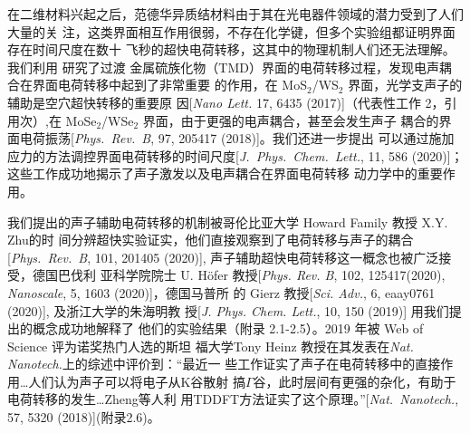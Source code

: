 


在二维材料兴起之后，范德华异质结材料由于其在光电器件领域的潜力受到了人们大量的关
注，这类界面相互作用很弱，不存在化学键，但多个实验组都证明界面存在时间尺度在数十
飞秒的超快电荷转移，这其中的物理机制人们还无法理解。我们利用 \hnamd{} 研究了过渡
金属硫族化物（TMD）界面的电荷转移过程，发现电声耦合在界面电荷转移中起到了非常重要
的作用，在 MoS$_2$/WS$_2$ 界面，光学支声子的辅助是空穴超快转移的重要原
因[\textit{Nano Lett.} 17, 6435 (2017)]（代表性工作 2，引
用次）,在 MoSe$_2$/WSe$_2$ 界面，由于更强的电声耦合，甚至会发生声子
耦合的界面电荷振荡[\textit{Phys.\ Rev.\ B}, 97, 205417 (2018)]。我们还进一步提出
可以通过施加应力的方法调控界面电荷转移的时间尺度[\textit{J.\ Phys.\ Chem.\
  Lett.}, 11, 586 (2020)]；这些工作成功地揭示了声子激发以及电声耦合在界面电荷转移
动力学中的重要作用。

\begin{justify} 
  \small\kaishu\color{magenta}{}
  我们提出的声子辅助电荷转移的机制被哥伦比亚大学 Howard Family 教授 X.Y.  Zhu的时
  间分辨超快实验证实，他们直接观察到了电荷转移与声子的耦合[\textit{Phys.\ Rev.\
    B}, 101, 201405 (2020)], 声子辅助超快电荷转移这一概念也被广泛接受，德国巴伐利
  亚科学院院士 U.  H\"ofer 教授[\textit{Phys. Rev. B}, 102, 125417(2020),
  \textit{Nanoscale}, 5, 1603 (2020)]，德国马普所
  的 Gierz 教授[\textit{Sci. Adv.}, 6, eaay0761 (2020)], 及浙江大学的朱海明教
  授[\textit{J. Phys. Chem. Lett.}, 10, 150 (2019)] 用我们提出的概念成功地解释了
  他们的实验结果（附录 2.1-2.5）。2019 年被 Web of Science 评为诺奖热门人选的斯坦
  福大学Tony Heinz 教授在其发表在\textit{Nat. Nanotech.}上的综述中评价到：“最近一
  些工作证实了声子在电荷转移中的直接作用\ldots{}人们认为声子可以将电子从K谷散射
  搞$\Gamma$谷，此时层间有更强的杂化，有助于电荷转移的发生\ldots{}Zheng等人利
  用TDDFT方法证实了这个原理。”[\textit{Nat.\ Nanotech.}, 57, 5320
  (2018)](附录2.6)。
\end{justify}

  

